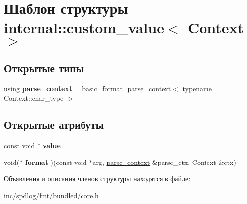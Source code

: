\hypertarget{structinternal_1_1custom__value}{}\section{Шаблон структуры internal\+:\+:custom\+\_\+value$<$ Context $>$}
\label{structinternal_1_1custom__value}
\subsection*{Открытые типы}
\begin{DoxyCompactItemize}
\item 
\mbox{\label{structinternal_1_1custom__value_aea06b37bcdc5b70765850b71012f4d0a}} 
using {\bfseries parse\+\_\+context} = \hyperlink{classbasic__format__parse__context}{basic\+\_\+format\+\_\+parse\+\_\+context}$<$ typename Context\+::char\+\_\+type $>$
\end{DoxyCompactItemize}
\subsection*{Открытые атрибуты}
\begin{DoxyCompactItemize}
\item 
\mbox{\label{structinternal_1_1custom__value_ae709a1d791335ff50d6f3ac36bd57a34}} 
const void $\ast$ {\bfseries value}
\item 
\mbox{\label{structinternal_1_1custom__value_a03c28ae02fb21b46bde144f1d25fc7d9}} 
void($\ast$ {\bfseries format} )(const void $\ast$arg, \hyperlink{classbasic__format__parse__context}{parse\+\_\+context} \&parse\+\_\+ctx, Context \&ctx)
\end{DoxyCompactItemize}


Объявления и описания членов структуры находятся в файле\+:\begin{DoxyCompactItemize}
\item 
inc/spdlog/fmt/bundled/core.\+h\end{DoxyCompactItemize}
